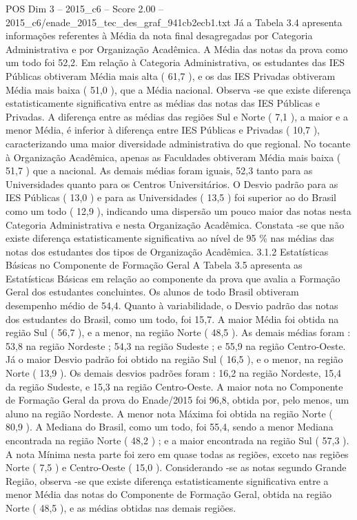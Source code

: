 \begin{textsample}{POS Dim 3 – 2015\_c6 – Score 2.00 – 2015\_c6/enade\_2015\_tec\_des\_graf\_941cb2ecb1.txt}
Já a Tabela 3.4 apresenta informações referentes à Média da nota final desagregadas por Categoria Administrativa e por Organização Acadêmica.
A Média das notas da prova como um todo foi 52,2.
Em relação à Categoria Administrativa, os estudantes das IES Públicas obtiveram Média mais alta ( 61,7 ), e os das IES Privadas obtiveram Média mais baixa ( 51,0 ), que a Média nacional.
Observa -se que existe diferença estatisticamente significativa entre as médias das notas das IES Públicas e Privadas.
A diferença entre as médias das regiões Sul e Norte ( 7,1 ), a maior e a menor Média, é inferior à diferença entre IES Públicas e Privadas ( 10,7 ), caracterizando uma maior diversidade administrativa do que regional.
No tocante à Organização Acadêmica, apenas as Faculdades obtiveram Média mais baixa ( 51,7 ) que a nacional.
As demais médias foram iguais, 52,3 tanto para as Universidades quanto para os Centros Universitários.
O Desvio padrão para as IES Públicas ( 13,0 ) e para as Universidades ( 13,5 ) foi superior ao do Brasil como um todo ( 12,9 ), indicando uma dispersão um pouco maior das notas nesta Categoria Administrativa e nesta Organização Acadêmica.
Constata -se que não existe diferença estatisticamente significativa ao nível de 95 \% nas médias das notas dos estudantes dos tipos de Organização Acadêmica. 3.1.2 Estatísticas Básicas no Componente de Formação Geral A Tabela 3.5 apresenta as Estatísticas Básicas em relação ao componente da prova que avalia a Formação Geral dos estudantes concluintes.
Os alunos de todo Brasil obtiveram desempenho médio de 54,4.
Quanto à variabilidade, o Desvio padrão das notas dos estudantes do Brasil, como um todo, foi 15,7.
A maior Média foi obtida na região Sul ( 56,7 ), e a menor, na região Norte ( 48,5 ).
As demais médias foram : 53,8 na região Nordeste ; 54,3 na região Sudeste ; e 55,9 na região Centro-Oeste.
Já o maior Desvio padrão foi obtido na região Sul ( 16,5 ), e o menor, na região Norte ( 13,9 ).
Os demais desvios padrões foram : 16,2 na região Nordeste, 15,4 da região Sudeste, e 15,3 na região Centro-Oeste.
A maior nota no Componente de Formação Geral da prova do Enade/2015 foi 96,8, obtida por, pelo menos, um aluno na região Nordeste.
A menor nota Máxima foi obtida na região Norte ( 80,9 ).
A Mediana do Brasil, como um todo, foi 55,4, sendo a menor Mediana encontrada na região Norte ( 48,2 ) ; e a maior encontrada na região Sul ( 57,3 ).
A nota Mínima nesta parte foi zero em quase todas as regiões, exceto nas regiões Norte ( 7,5 ) e Centro-Oeste ( 15,0 ).
Considerando -se as notas segundo Grande Região, observa -se que existe diferença estatisticamente significativa entre a menor Média das notas do Componente de Formação Geral, obtida na região Norte ( 48,5 ), e as médias obtidas nas demais regiões.

\end{textsample}
